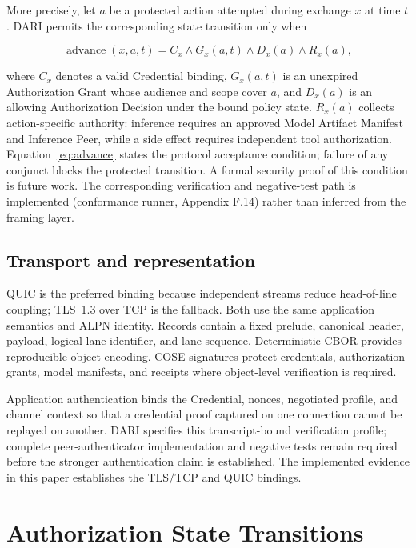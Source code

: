 \documentclass[10pt]{article}
\begin{document}
More precisely, let $a$ be a protected action attempted during exchange $x$ at time $t$. DARI permits the corresponding state transition only when

\begin{equation}
\operatorname{advance}(x,a,t) = C_x \land G_x(a,t)
  \land D_x(a) \land R_x(a),
\label{eq:advance}
\end{equation}

where $C_x$ denotes a valid Credential binding, $G_x(a,t)$ is an unexpired Authorization Grant whose audience and scope cover $a$, and $D_x(a)$ is an allowing Authorization Decision under the bound policy state. $R_x(a)$ collects action-specific authority: inference requires an approved Model Artifact Manifest and Inference Peer, while a side effect requires independent tool authorization. Equation~\ref{eq:advance} states the protocol acceptance condition; failure of any conjunct blocks the protected transition. A formal security proof of this condition is future work. The corresponding verification and negative-test path is implemented (conformance runner, Appendix F.14) rather than inferred from the framing layer.

\subsection{Transport and representation}

QUIC is the preferred binding because independent streams reduce head-of-line coupling; TLS~1.3 over TCP is the fallback. Both use the same application semantics and ALPN identity. Records contain a fixed prelude, canonical header, payload, logical lane identifier, and lane sequence. Deterministic CBOR provides reproducible object encoding. COSE signatures protect credentials, authorization grants, model manifests, and receipts where object-level verification is required.

Application authentication binds the Credential, nonces, negotiated profile, and channel context so that a credential proof captured on one connection cannot be replayed on another. DARI specifies this transcript-bound verification profile; complete peer-authenticator implementation and negative tests remain required before the stronger authentication claim is established. The implemented evidence in this paper establishes the TLS/TCP and QUIC bindings.

\section{Authorization State Transitions}
\end{document}
